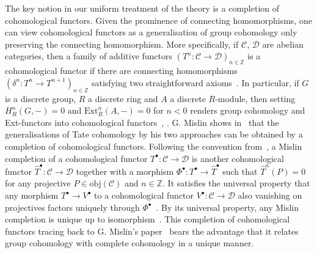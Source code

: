 \documentclass[12pt,a4paper]{article}
\numberwithin{equation}{section}
\theoremstyle{nonumberplain}
\begin{document}
The key notion in our uniform treatment of the theory is a completion of cohomological functors. Given the prominence of connecting homomorphisms, one can view cohomological functors as a generalisation of group cohomology only preserving the connecting homomorphism. More specifically, if $\mathcal{C}$, $\mathcal{D}$ are abelian categories, then a family of additive functors $(T^n: \mathcal{C} \rightarrow \mathcal{D})_{n \in \mathbb{Z}}$ is a cohomological functor if there are connecting homomorphisms $(\delta^n: T^n \rightarrow T^{n+1})_{n \in \mathbb{Z}}$ satisfying two straightforward axioms~\cite[p.~201--202]{kro95}. In particular, if $G$ is a discrete group, $R$ a discrete ring and $A$ a  discrete $R$-module, then  setting $H_R^n(G, -) = 0$ and $\mathrm{Ext}_R^n(A,-) = 0$ for $n < 0$ renders group cohomology and Ext-functors into cohomological functors~\cite[p.~201]{kro95}, \cite[p.~295]{mis94}. G.\! Mislin shows in~\cite{mis94} that the generalisations of Tate cohomology by his two approaches can be obtained by a completion of cohomological functors. Following the convention from~\cite[p.~197/202]{kro95}, a Mislin completion of a cohomological functor $T^{\bullet}: \mathcal{C} \rightarrow \mathcal{D}$ is another cohomological functor $\widehat{T}^{\bullet}: \mathcal{C} \rightarrow \mathcal{D}$ together with a morphism $\Phi^{\bullet}: T^{\bullet} \rightarrow \widehat{T}^{\bullet}$ such that $\widehat{T}^n(P) = 0$ for any projective $P \in \mathrm{obj}(\mathcal{C})$ and $n \in \mathbb{Z}$. It satisfies the universal property that any morphism $T^{\bullet} \rightarrow V^{\bullet}$ to a cohomological functor $V^{\bullet}: \mathcal{C} \rightarrow \mathcal{D}$ also vanishing on projectives factors uniquely through $\Phi^{\bullet}$~\cite[Definition~2.1]{mis94}. By its universal property, any Mislin completion is unique up to isomorphism~\cite[p.~202]{kro95}. This completion of cohomological functors tracing back to G.\! Mislin's paper~\cite{mis94} bears the advantage that it relates group cohomology with complete cohomology in a unique manner. \\
\end{document}
